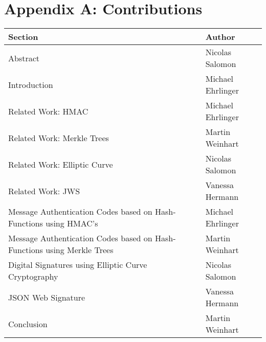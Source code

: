 \section{Appendix A: Contributions}

\begin{longtable}[ht]{|p{}|p{}|}
\hline
Section & Author \\ \hline \hline
Abstract & Nicolas Salomon \\ \hline
Introduction & Michael Ehrlinger \\ \hline
Related Work: HMAC & Michael Ehrlinger \\ \hline
Related Work: Merkle Trees & Martin Weinhart\\ \hline
Related Work: Elliptic Curve & Nicolas Salomon\\ \hline
Related Work: JWS & Vanessa Hermann\\ \hline
Message Authentication Codes based on Hash-Functions using HMAC's & Michael Ehrlinger \\ \hline
Message Authentication Codes based on Hash-Functions using Merkle Trees & Martin Weinhart \\ \hline
Digital Signatures using Elliptic Curve Cryptography & Nicolas Salomon \\ \hline
JSON Web Signature & Vanessa Hermann \\ \hline
Conclusion & Martin Weinhart \\ \hline


\end{longtable}